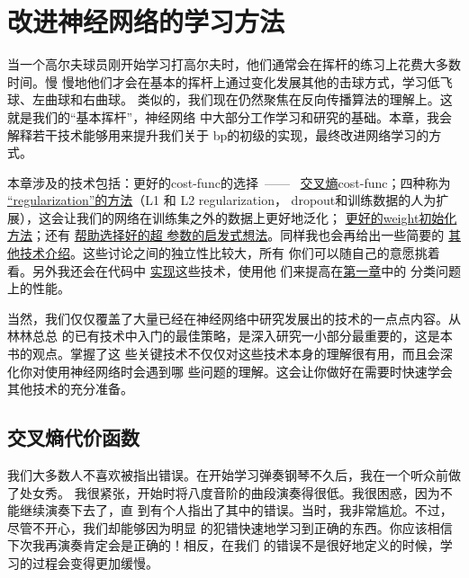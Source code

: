 
\chapter{改进神经网络的学习方法}
\label{ch:ImprovingTheWayNeuralNetworksLearn}

当一个高尔夫球员刚开始学习打高尔夫时，他们通常会在挥杆的练习上花费大多数时间。慢
慢地他们才会在基本的挥杆上通过变化发展其他的击球方式，学习低飞球、左曲球和右曲球。
类似的，我们现在仍然聚焦在反向传播算法的理解上。这就是我们的“基本挥杆”，神经网络
中大部分工作学习和研究的基础。本章，我会解释若干技术能够用来提升我们关于%
\gls*{bp}的初级的实现，最终改进网络学习的方式。

本章涉及的技术包括：更好的\gls*{cost-func}的选择~——~%
\hyperref[sec:the_cross-entropy_cost_function]{交叉熵}\gls*{cost-func}；四种称为%
\hyperref[sec:overfitting_and_regularization]{“\gls*{regularization}”的方法}（L1 和 L2 \gls*{regularization}，
  \gls*{dropout}和训练数据的人为扩展），这会让我们的网络在训练集之外的数据上更好地泛化；%
\hyperref[sec:weight_initialization]{更好的\gls*{weight}初始化方法}；还有%
\hyperref[sec:how_to_choose_a_neural_network's_hyper-parameters]{帮助选择好的超
  参数的启发式想法}。同样我也会再给出一些简要的%
\hyperref[sec:other_techniques]{其他技术介绍}。这些讨论之间的独立性比较大，所有
你们可以随自己的意愿挑着看。另外我还会在代码中%
\hyperref[sec:handwriting_recognition_revisited_the_code]{实现}这些技术，使用他
们来提高在\hyperref[ch:UsingNeuralNetsToRecognizeHandwrittenDigits]{第一章}中的
分类问题上的性能。

当然，我们仅仅覆盖了大量已经在神经网络中研究发展出的技术的一点点内容。从林林总总
的已有技术中入门的最佳策略，是深入研究一小部分最重要的，这是本书的观点。掌握了这
些关键技术不仅仅对这些技术本身的理解很有用，而且会深化你对使用神经网络时会遇到哪
些问题的理解。这会让你做好在需要时快速学会其他技术的充分准备。

\section{交叉熵代价函数}
\label{sec:the_cross-entropy_cost_function}

我们大多数人不喜欢被指出错误。在开始学习弹奏钢琴不久后，我在一个听众前做了处女秀。
我很紧张，开始时将八度音阶的曲段演奏得很低。我很困惑，因为不能继续演奏下去了，直
到有个人指出了其中的错误。当时，我非常尴尬。不过，尽管不开心，我们却能够因为明显
的犯错快速地学习到正确的东西。你应该相信下次我再演奏肯定会是正确的！相反，在我们
的错误不是很好地定义的时候，学习的过程会变得更加缓慢。

